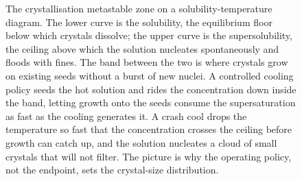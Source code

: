 \begin{figure}[htbp]
\centering
{}
\caption[The metastable zone and the crystallisation cooling
policy]{The crystallisation metastable zone on a solubility-temperature
diagram. The lower curve is the solubility, the equilibrium floor below which
crystals dissolve; the upper curve is the supersolubility, the ceiling above
which the solution nucleates spontaneously and floods with fines. The band
between the two is where crystals grow on existing seeds without a burst of
new nuclei. A controlled cooling policy seeds the hot solution and rides the
concentration down inside the band, letting growth onto the seeds consume the
supersaturation as fast as the cooling generates it. A crash cool drops the
temperature so fast that the concentration crosses the ceiling before growth
can catch up, and the solution nucleates a cloud of small crystals that will
not filter. The picture is why the operating policy, not the endpoint, sets
the crystal-size distribution.}
\label{fig:vol04ch07:metastable-zone}
\end{figure}
